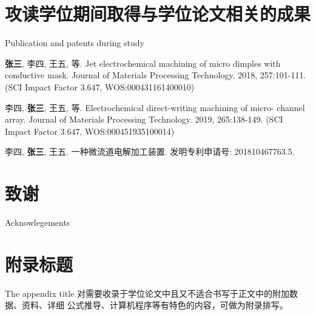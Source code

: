 \documentclass[
  type=master
]{gdutthesis}
\begin{document}
\zhlipsum[1]

\nocite{*}%
\printbibliography

\chapter{攻读学位期间取得与学位论文相关的成果}{Publication and patents during study}


\begin{results}
  \item \textbf{张三}, 李四, 王五, 等. Jet electrochemical machining of micro dimples with conductive mask.
  Journal of Materials Processing Technology. 2018, 257:101-111. (SCI Impact Factor 3.647,
  WOS:000431161400010)
  \item 李四, \textbf{张三}, 王五, 等. Electrochemical direct-writing machining of micro- channel array.
  Journal of Materials Processing Technology. 2019, 265:138-149. (SCI Impact Factor 3.647,
  WOS:000451935100014)
\end{results}


\begin{results}
  \item 李四, \textbf{张三}, 王五. 一种微流道电解加工装置. 发明专利申请号: 201810467763.5.
\end{results}

\gdutstatement%

\chapter{致谢}{Acknowlegements}
\zhlipsum[1]

\gdutappendix

\chapter{附录标题}{The appendix title}
对需要收录于学位论文中且又不适合书写于正文中的附加数据、资料、详细
公式推导、计算机程序等有特色的内容，可做为附录排写。
\end{document}
